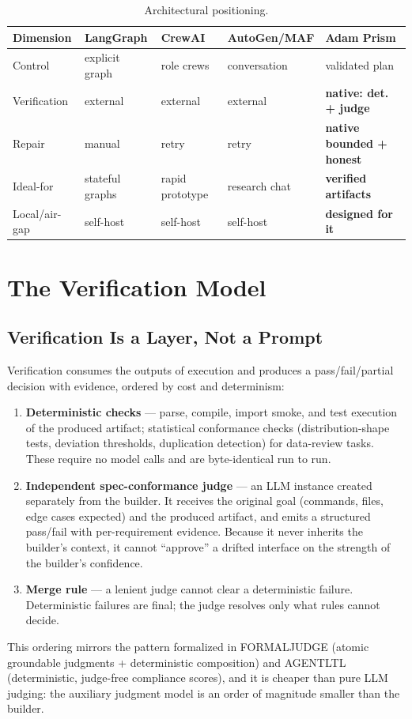 \documentclass[11pt]{article}
\begin{document}
\begin{table}[t!]\centering
\caption{Architectural positioning. \label{tab:positioning}}
\begin{tabular}{@{}lllll@{}}
\toprule
Dimension & LangGraph & CrewAI & AutoGen/MAF & Adam Prism\\
\midrule
Control & explicit graph & role crews & conversation & validated plan\\
Verification & external & external & external & \textbf{native: det. + judge}\\
Repair & manual & retry & retry & \textbf{native bounded + honest}\\
Ideal-for & stateful graphs & rapid prototype & research chat & \textbf{verified artifacts}\\
Local/air-gap & self-host & self-host & self-host & \textbf{designed for it}\\
\bottomrule
\end{tabular}
\end{table}

\section{The Verification Model}\label{sec:verify}
\subsection{Verification Is a Layer, Not a Prompt}
Verification consumes the outputs of execution and produces a pass/fail/partial decision
with evidence, ordered by cost and determinism:
\begin{enumerate}
  \item \textbf{Deterministic checks} --- parse, compile, import smoke, and test
        execution of the produced artifact; statistical conformance checks
        (distribution-shape tests, deviation thresholds, duplication detection) for
        data-review tasks. These require no model calls and are byte-identical run to run.
  \item \textbf{Independent spec-conformance judge} --- an LLM instance created separately
        from the builder. It receives the original goal (commands, files, edge cases
        expected) and the produced artifact, and emits a structured pass/fail with
        per-requirement evidence. Because it never inherits the builder's context, it
        cannot ``approve'' a drifted interface on the strength of the builder's confidence.
  \item \textbf{Merge rule} --- a lenient judge cannot clear a deterministic failure.
        Deterministic failures are final; the judge resolves only what rules cannot
        decide.
\end{enumerate}
This ordering mirrors the pattern formalized in FORMALJUDGE (atomic groundable judgments
+ deterministic composition) and AGENTLTL (deterministic, judge-free compliance scores),
and it is cheaper than pure LLM judging: the auxiliary judgment model is an order of
magnitude smaller than the builder.
\end{document}
